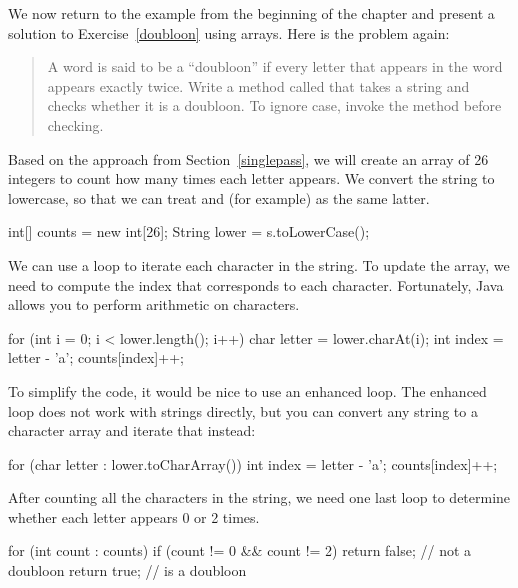 We now return to the example from the beginning of the chapter and present a solution to Exercise~\ref{doubloon} using arrays.
Here is the problem again:

\begin{quote}
A word is said to be a ``doubloon'' if every letter that appears in the word appears exactly twice.
Write a method called  that takes a string and checks whether it is a doubloon.
To ignore case, invoke the  method before checking.
\end{quote}

Based on the approach from Section~\ref{singlepass}, we will create an array of 26 integers to count how many times each letter appears.
We convert the string to lowercase, so that we can treat  and  (for example) as the same latter.

\begin{code}
int[] counts = new int[26];
String lower = s.toLowerCase();
\end{code}

We can use a  loop to iterate each character in the string.
To update the  array, we need to compute the index that corresponds to each character.
Fortunately, Java allows you to perform arithmetic on characters.

\begin{code}
for (int i = 0; i < lower.length(); i++) {
    char letter = lower.charAt(i);
    int index = letter - 'a';
    counts[index]++;
}
\end{code}


To simplify the code, it would be nice to use an enhanced  loop.
The enhanced  loop does not work with strings directly, but you can convert any string to a character array and iterate that instead:

\begin{code}
for (char letter : lower.toCharArray()) {
    int index = letter - 'a';
    counts[index]++;
}
\end{code}

After counting all the characters in the  string, we need one last  loop to determine whether each letter appears 0 or 2 times.

\begin{code}
for (int count : counts) {
    if (count != 0 && count != 2) {
        return false;  // not a doubloon
    }
}
return true;  // is a doubloon
\end{code}

